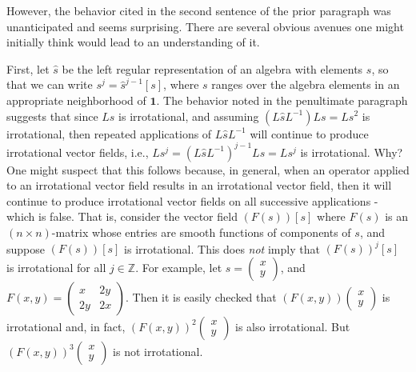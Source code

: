 \documentclass{amsart}
\theoremstyle{definition}
\numberwithin{theorem}{section}
\numberwithin{equation}{section}
\begin{document}
However, the behavior cited in the second sentence of the prior paragraph was unanticipated and seems surprising. There are several obvious avenues one might initially think would lead to an understanding of it.

First, let $\hat{s}$ be the left regular representation of an algebra with elements $s$, so that we can write $s^j = \hat{s}^{j-1}[s]$, where $s$ ranges over the algebra elements in an appropriate neighborhood of $\mathbf{1}$.  The behavior noted in the penultimate paragraph suggests that since $Ls$ is irrotational, and assuming $(L\hat{s}L^{-1})Ls = Ls^2$ is irrotational, then repeated applications of $L\hat{s}L^{-1}$ will continue to produce irrotational vector fields, i.e., $Ls^j = (L\hat{s}L^{-1})^{j-1}Ls = Ls^j$ is irrotational.  Why?
One might suspect that this follows because, in general, when an operator applied to an irrotational vector field results in an irrotational vector field, then it will continue to produce irrotational vector fields on all successive applications - which is false.  That is, consider the vector field $(F(s))[s]$ where $F(s)$ is an $(n\times n)$-matrix whose entries are smooth functions of components of $s$, and suppose $(F(s))[s]$ is irrotational.  This does {\it not} imply that $(F(s))^j[s]$ is irrotational for all $j\in\mathbb{Z}$. For example, let \mbox{$s=\left(\begin{array}{ccc}
 x   \\ 
y    
\end{array}\right)$,} and \mbox{$F(x,y)= \left(\begin{array}{ccc}
x  & 2y   \\ 
 2y & 2x    
\end{array}\right)$.}  Then it is easily checked that $(F(x,y))\left(\begin{array}{ccc}
 x   \\ 
y    
\end{array}\right)$ is \mbox{irrotational} and, in fact, $(F(x,y))^2\left(\begin{array}{ccc}
 x   \\ 
y    
\end{array}\right)$ is also irrotational.  But $(F(x,y))^3\left(\begin{array}{ccc}
 x   \\ 
y    
\end{array}\right)$ is not irrotational.  
\end{document}
